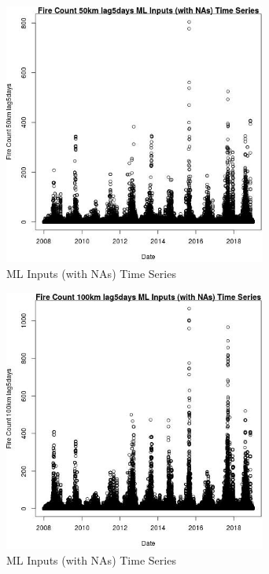 \begin{figure} 
\centering  
\includegraphics[width=0.77\textwidth]{Code_Outputs/Report_ML_input_PM25_Step4_part_f_de_duplicated_aves_prioritize_24hr_obswNAs_Fire_Count_50km_lag5daysvDate.jpg} 
\caption{\label{fig:Report_ML_input_PM25_Step4_part_f_de_duplicated_aves_prioritize_24hr_obswNAsFire_Count_50km_lag5daysvDate}ML Inputs (with NAs) Time Series} 
\end{figure} 
 

\clearpage 

\begin{figure} 
\centering  
\includegraphics[width=0.77\textwidth]{Code_Outputs/Report_ML_input_PM25_Step4_part_f_de_duplicated_aves_prioritize_24hr_obswNAs_Fire_Count_100km_lag5daysvDate.jpg} 
\caption{\label{fig:Report_ML_input_PM25_Step4_part_f_de_duplicated_aves_prioritize_24hr_obswNAsFire_Count_100km_lag5daysvDate}ML Inputs (with NAs) Time Series} 
\end{figure} 
 

